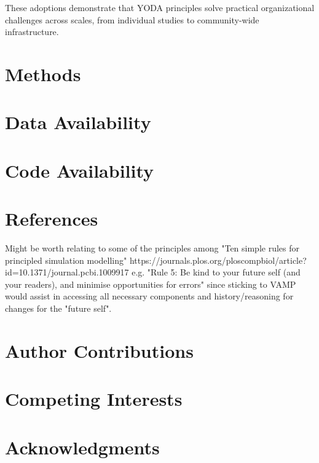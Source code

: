 \documentclass{article}
\begin{document}
These adoptions demonstrate that YODA principles solve practical organizational challenges across scales, from individual studies to community-wide infrastructure.

\section{Methods}
\section{Data Availability}
\section{Code Availability}
\section{References}

Might be worth relating to some of the principles among "Ten simple rules for principled simulation modelling"
https://journals.plos.org/ploscompbiol/article?id=10.1371/journal.pcbi.1009917 e.g.
"Rule 5: Be kind to your future self (and your readers), and minimise opportunities for errors" since sticking to
VAMP would assist in accessing all necessary components and history/reasoning for changes for the "future self".

\section{Author Contributions}
\section{Competing Interests}
\section{Acknowledgments}
\end{document}
